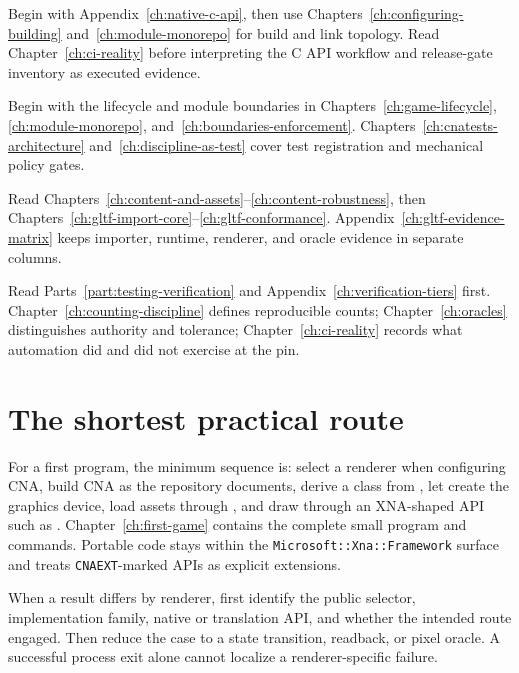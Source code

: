 \begin{description}[style=nextline,leftmargin=3.2cm,labelwidth=2.8cm]
  \item[Native C consumer]
    Begin with Appendix~\ref{ch:native-c-api}, then use Chapters~\ref{ch:configuring-building}
    and~\ref{ch:module-monorepo} for build and link topology. Read Chapter~\ref{ch:ci-reality}
    before interpreting the C API workflow and release-gate inventory as executed evidence.

  \item[Framework contributor]
    Begin with the lifecycle and module boundaries in Chapters~\ref{ch:game-lifecycle},
    \ref{ch:module-monorepo}, and~\ref{ch:boundaries-enforcement}. Chapters~\ref{ch:cnatests-architecture}
    and~\ref{ch:discipline-as-test} cover test registration and mechanical policy gates.

  \item[Content or glTF contributor]
    Read Chapters~\ref{ch:content-and-assets}--\ref{ch:content-robustness}, then
    Chapters~\ref{ch:gltf-import-core}--\ref{ch:gltf-conformance}. Appendix~\ref{ch:gltf-evidence-matrix}
    keeps importer, runtime, renderer, and oracle evidence in separate columns.

  \item[Verification contributor]
    Read Parts~\ref{part:testing-verification} and Appendix~\ref{ch:verification-tiers} first.
    Chapter~\ref{ch:counting-discipline} defines reproducible counts; Chapter~\ref{ch:oracles}
    distinguishes authority and tolerance; Chapter~\ref{ch:ci-reality} records what automation
    did and did not exercise at the pin.
\end{description}

\section*{The shortest practical route}

For a first program, the minimum sequence is: select a renderer when configuring CNA, build CNA
as the repository documents, derive a class from , let
 create the graphics device, load assets through
, and draw through an XNA-shaped API such as .
Chapter~\ref{ch:first-game} contains the complete small program and commands. Portable code stays
within the \texttt{Microsoft::Xna::Framework} surface and treats \texttt{CNAEXT}-marked APIs as
explicit extensions.

When a result differs by renderer, first identify the public selector, implementation family,
native or translation API, and whether the intended route engaged. Then reduce the case to a
state transition, readback, or pixel oracle. A successful process exit alone cannot localize a
renderer-specific failure.
